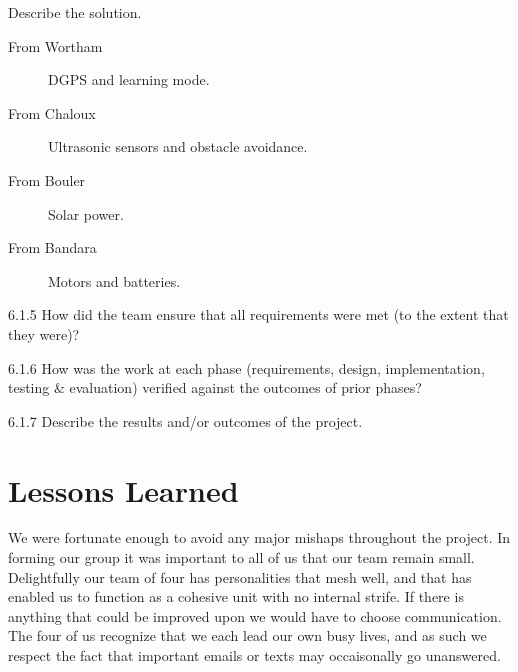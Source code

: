 \documentclass[12pt,letterpaper]{article}
\begin{document}

Describe the solution.

\begin{description}
\item[From Wortham] DGPS and learning mode.
\item[From Chaloux] Ultrasonic sensors and obstacle avoidance.
\item[From Bouler] Solar power.
\item[From Bandara] Motors and batteries.
\end{description} 


6.1.5 How did the team ensure that all requirements were met (to the extent that they were)?

6.1.6 How was the work at each phase (requirements, design, implementation, testing \& evaluation) verified against the outcomes of prior phases?

6.1.7 Describe the results and/or outcomes of the project.

\section{Lessons Learned}


We were fortunate enough to avoid any major mishaps throughout the project. In
forming our group it was important to all of us that our team remain small.
Delightfully our team of four has personalities that mesh well, and that has
enabled us to function as a cohesive unit with no internal strife.
If there is anything that could be improved upon we would have to choose
communication.  The four of us recognize that we each lead our own busy lives,
and as such we respect the fact that important emails or texts may occaisonally
go unanswered.


\end{document}
